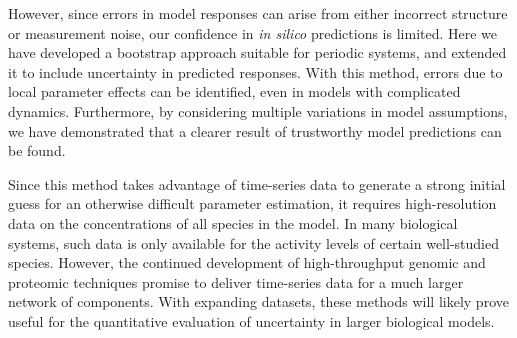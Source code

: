 However, since errors in model responses can arise from either incorrect
structure or measurement noise, our confidence in {\itshape in silico}
predictions is limited. Here we have developed a bootstrap approach suitable for
periodic systems, and extended it to include uncertainty in predicted
responses. With this method, errors due to local parameter effects can
be identified, even in models with complicated dynamics. Furthermore, by
considering multiple variations in model assumptions, we have demonstrated that
a clearer result of trustworthy model predictions can be found.

Since this method takes advantage of time-series data to generate a strong
initial guess for an otherwise difficult parameter estimation, it requires
high-resolution data on the concentrations of all species in the model. In many
biological systems, such data is only available for the activity levels of
certain well-studied species. However, the continued development of
high-throughput genomic and proteomic techniques promise to deliver time-series
data for a much larger network of components. With expanding datasets, these
methods will likely prove useful for the quantitative evaluation of uncertainty
in larger biological models.
